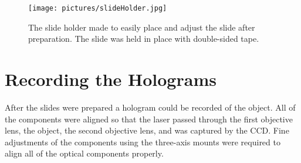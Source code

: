 %
\begin{figure}[htbp!]
\begin{center}
    \texttt{[image: pictures/slideHolder.jpg]}
\end{center}
\caption{The slide holder made to easily place and adjust the slide
after preparation. The slide was held in place with double-sided tape.}
\label{fig:slideHolder}
\end{figure}


\section{Recording the Holograms}

After the slides were prepared a hologram could be recorded of the object. 
All of the components were
aligned so that the laser passed through the first objective lens, the object,
the second objective lens, and was captured by the CCD\@. Fine
adjustments of the components using the three-axis mounts were required to
align all of the optical
components properly.
%

